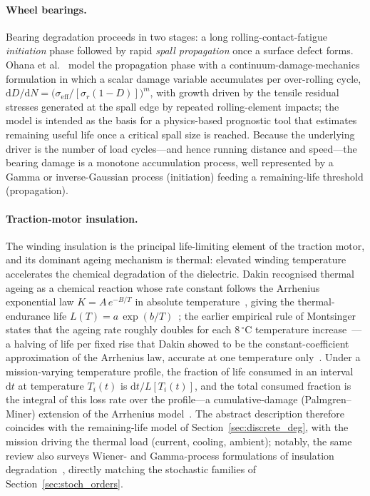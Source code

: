 \documentclass[11pt,a4paper]{article}
\theoremstyle{plain}
\theoremstyle{definition}
\theoremstyle{remark}
\begin{document}
\paragraph{Wheel bearings.}
Bearing degradation proceeds in two stages: a long rolling-contact-fatigue \emph{initiation} phase followed by rapid \emph{spall propagation} once a surface defect forms.
Ohana et al.~\cite[Sec.~2.1.3]{Ohana2023} model the propagation phase with a continuum-damage-mechanics formulation in which a scalar damage variable accumulates per over-rolling cycle, $\mathrm{d}D/\mathrm{d}N = \bigl(\sigma_{\mathrm{eff}}/[\sigma_r(1-D)]\bigr)^m$, with growth driven by the tensile residual stresses generated at the spall edge by repeated rolling-element impacts; the model is intended as the basis for a physics-based prognostic tool that estimates remaining useful life once a critical spall size is reached.
Because the underlying driver is the number of load cycles---and hence running distance and speed---the bearing damage is a monotone accumulation process, well represented by a Gamma or inverse-Gaussian process (initiation) feeding a remaining-life threshold (propagation).

\paragraph{Traction-motor insulation.}
The winding insulation is the principal life-limiting element of the traction motor, and its dominant ageing mechanism is thermal: elevated winding temperature accelerates the chemical degradation of the dielectric.
Dakin recognised thermal ageing as a chemical reaction whose rate constant follows the Arrhenius exponential law $K = A\,e^{-B/T}$ in absolute temperature~\cite[Eq.~5]{Dakin1948}, giving the thermal-endurance life $L(T) = a\,\exp(b/T)$~\cite[Eq.~1]{Zhang2025insul}; the earlier empirical rule of Montsinger states that the ageing rate roughly doubles for each 8\,$^\circ$C temperature increase~\cite[Synopsis, p.~776]{Montsinger1930}---a halving of life per fixed rise that Dakin showed to be the constant-coefficient approximation of the Arrhenius law, accurate at one temperature only~\cite[Fig.~1 and discussion of Eq.~5]{Dakin1948}.
Under a mission-varying temperature profile, the fraction of life consumed in an interval $\mathrm{d}t$ at temperature $T_i(t)$ is $\mathrm{d}t/L[T_i(t)]$, and the total consumed fraction is the integral of this loss rate over the profile---a cumulative-damage (Palmgren--Miner) extension of the Arrhenius model~\cite[Eq.~2 and Fig.~10]{Zhang2025insul}.
The abstract description therefore coincides with the remaining-life model of Section~\ref{sec:discrete_deg}, with the mission driving the thermal load (current, cooling, ambient); notably, the same review also surveys Wiener- and Gamma-process formulations of insulation degradation~\cite[Sec.~5]{Zhang2025insul}, directly matching the stochastic families of Section~\ref{sec:stoch_orders}.
\end{document}
